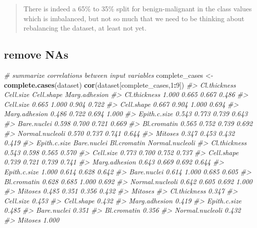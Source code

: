 \documentclass[]{book}
\newenvironment{Shaded}{\begin{snugshade}}{\end{snugshade}}
\newcommand{\CommentTok}[1]{\textcolor[rgb]{0.56,0.35,0.01}{\textit{#1}}}
\newcommand{\DecValTok}[1]{\textcolor[rgb]{0.00,0.00,0.81}{#1}}
\newcommand{\KeywordTok}[1]{\textcolor[rgb]{0.13,0.29,0.53}{\textbf{#1}}}
\newcommand{\NormalTok}[1]{#1}
\newcommand{\OperatorTok}[1]{\textcolor[rgb]{0.81,0.36,0.00}{\textbf{#1}}}
\newcommand{\StringTok}[1]{\textcolor[rgb]{0.31,0.60,0.02}{#1}}
\begin{document}
\begin{quote}
There is indeed a 65\% to 35\% split for benign-malignant in the class values which is imbalanced, but not so much that we need to be thinking about rebalancing the dataset, at least not yet.
\end{quote}

\hypertarget{remove-nas}{%
\subsection{remove NAs}\label{remove-nas}}

\begin{Shaded}
\begin{Highlighting}[]
\CommentTok{# summarize correlations between input variables}
\NormalTok{complete_cases <-}\StringTok{ }\KeywordTok{complete.cases}\NormalTok{(dataset)}
\KeywordTok{cor}\NormalTok{(dataset[complete_cases,}\DecValTok{1}\OperatorTok{:}\DecValTok{9}\NormalTok{])}
\CommentTok{#>                 Cl.thickness Cell.size Cell.shape Marg.adhesion}
\CommentTok{#> Cl.thickness           1.000     0.665      0.667         0.486}
\CommentTok{#> Cell.size              0.665     1.000      0.904         0.722}
\CommentTok{#> Cell.shape             0.667     0.904      1.000         0.694}
\CommentTok{#> Marg.adhesion          0.486     0.722      0.694         1.000}
\CommentTok{#> Epith.c.size           0.543     0.773      0.739         0.643}
\CommentTok{#> Bare.nuclei            0.598     0.700      0.721         0.669}
\CommentTok{#> Bl.cromatin            0.565     0.752      0.739         0.692}
\CommentTok{#> Normal.nucleoli        0.570     0.737      0.741         0.644}
\CommentTok{#> Mitoses                0.347     0.453      0.432         0.419}
\CommentTok{#>                 Epith.c.size Bare.nuclei Bl.cromatin Normal.nucleoli}
\CommentTok{#> Cl.thickness           0.543       0.598       0.565           0.570}
\CommentTok{#> Cell.size              0.773       0.700       0.752           0.737}
\CommentTok{#> Cell.shape             0.739       0.721       0.739           0.741}
\CommentTok{#> Marg.adhesion          0.643       0.669       0.692           0.644}
\CommentTok{#> Epith.c.size           1.000       0.614       0.628           0.642}
\CommentTok{#> Bare.nuclei            0.614       1.000       0.685           0.605}
\CommentTok{#> Bl.cromatin            0.628       0.685       1.000           0.692}
\CommentTok{#> Normal.nucleoli        0.642       0.605       0.692           1.000}
\CommentTok{#> Mitoses                0.485       0.351       0.356           0.432}
\CommentTok{#>                 Mitoses}
\CommentTok{#> Cl.thickness      0.347}
\CommentTok{#> Cell.size         0.453}
\CommentTok{#> Cell.shape        0.432}
\CommentTok{#> Marg.adhesion     0.419}
\CommentTok{#> Epith.c.size      0.485}
\CommentTok{#> Bare.nuclei       0.351}
\CommentTok{#> Bl.cromatin       0.356}
\CommentTok{#> Normal.nucleoli   0.432}
\CommentTok{#> Mitoses           1.000}
\end{Highlighting}
\end{Shaded}
\end{document}
